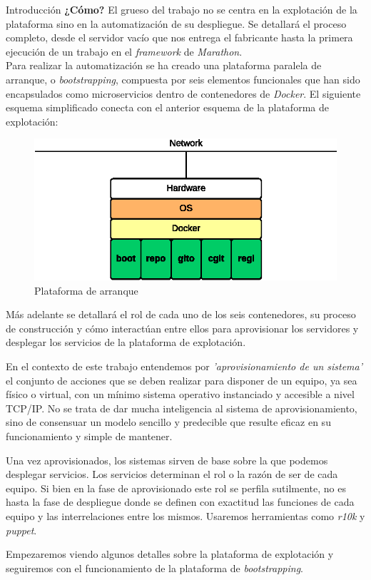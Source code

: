 \documentclass[a4paper,12pt,spanish,final]{epsc_tfc_pfc}
\begin{document}
\begin{intro}{Introducción}
\textbf{¿Cómo?} El grueso del trabajo no se centra en la explotación de la plataforma sino en la automatización de su despliegue. Se detallará el proceso completo, desde el servidor vacío que nos entrega el fabricante hasta la primera ejecución de un trabajo en el \emph{framework} de \emph{Marathon}.\\

Para realizar la automatización se ha creado una plataforma paralela de arranque, o \emph{bootstrapping}, compuesta por seis elementos funcionales que han sido encapsulados como microservicios dentro de contenedores de \emph{Docker}. El siguiente esquema simplificado conecta con el anterior esquema de la plataforma de explotación:

\begin{figure}[h]
  \centering
    \includegraphics[scale=1]{boot_platform}
      \caption{Plataforma de arranque}
\end{figure}

Más adelante se detallará el rol de cada uno de los seis contenedores, su proceso de construcción y cómo interactúan entre ellos para aprovisionar los servidores y desplegar los servicios de la plataforma de explotación.

En el contexto de este trabajo entendemos por \emph{'aprovisionamiento de un sistema'} el conjunto de acciones que se deben realizar para disponer de un equipo, ya sea físico o virtual, con un mínimo sistema operativo instanciado y accesible a nivel TCP/IP\@. No se trata de dar mucha inteligencia al sistema de aprovisionamiento, sino de consensuar un modelo sencillo y predecible que resulte eficaz en su funcionamiento y simple de mantener.

Una vez aprovisionados, los sistemas sirven de base sobre la que podemos desplegar servicios. Los servicios determinan el rol o la razón de ser de cada equipo. Si bien en la fase de aprovisionado este rol se perfila sutilmente, no es hasta la fase de despliegue donde se definen con exactitud las funciones de cada equipo y las interrelaciones entre los mismos. Usaremos herramientas como \emph{r10k} y \emph{puppet}.

Empezaremos viendo algunos detalles sobre la plataforma de explotación y seguiremos con el funcionamiento de la plataforma de \emph{bootstrapping}.
\end{intro}
\end{document}
